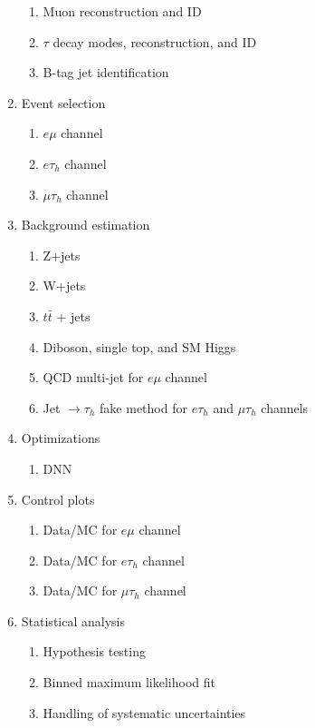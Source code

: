 \documentclass{article}
\begin{document}
\begin{enumerate}
        \begin{enumerate}
            \item Muon reconstruction and ID 
            \item $\tau$ decay modes, reconstruction, and ID
            \item B-tag jet identification
        \end{enumerate}
    \item Event selection 
        \begin{enumerate}
            \item $e\mu$ channel
            \item $e\tau_{h}$ channel
            \item $\mu\tau_{h}$ channel
        \end{enumerate}
    \item Background estimation 
        \begin{enumerate}
            \item Z+jets
            \item W+jets
            \item $t\bar{t}$ + jets
            \item Diboson, single top, and SM Higgs
            \item QCD multi-jet for $e\mu$ channel
            \item Jet $\rightarrow \tau_{h}$ fake method for $e\tau_{h}$ and $\mu\tau_{h}$ channels
        \end{enumerate}
    \item Optimizations
        \begin{enumerate}
            \item DNN
        \end{enumerate}
    \item Control plots
        \begin{enumerate}
            \item Data/MC for $e\mu$ channel
            \item Data/MC for $e\tau_{h}$ channel
            \item Data/MC for $\mu\tau_{h}$ channel
        \end{enumerate}
    \item Statistical analysis
        \begin{enumerate}
            \item Hypothesis testing
            \item Binned maximum likelihood fit 
            \item Handling of systematic uncertainties

\end{enumerate}
\end{enumerate}
\end{document}
